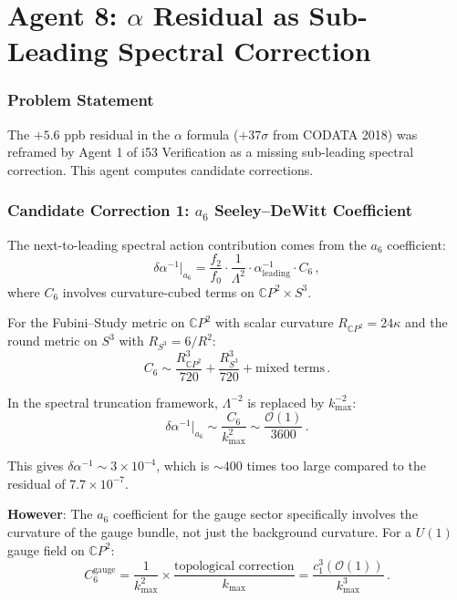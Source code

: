 \documentclass[11pt,a4paper]{article}
\newcommand{\CP}{\mathbb{C}P}
\begin{document}
\part{Agent 8: $\alpha$ Residual as Sub-Leading Spectral Correction}
\label{part:alpha-residual}

\section{Problem Statement}

The $+5.6$ ppb residual in the $\alpha$ formula ($+37\sigma$ from CODATA 2018) was reframed by Agent 1 of i53 Verification as a missing sub-leading spectral correction. This agent computes candidate corrections.

\section{Candidate Correction 1: $a_6$ Seeley--DeWitt Coefficient}

The next-to-leading spectral action contribution comes from the $a_6$ coefficient:
\begin{equation}
\delta\alpha^{-1}\big|_{a_6} = \frac{f_2}{f_0} \cdot \frac{1}{\Lambda^2} \cdot \alpha^{-1}_{\mathrm{leading}} \cdot C_6\,,
\end{equation}
where $C_6$ involves curvature-cubed terms on $\CP^2 \times S^3$.

For the Fubini--Study metric on $\CP^2$ with scalar curvature $R_{\CP^2} = 24\kappa$ and the round metric on $S^3$ with $R_{S^3} = 6/R^2$:
\begin{equation}
C_6 \sim \frac{R_{\CP^2}^3}{720} + \frac{R_{S^3}^3}{720} + \text{mixed terms}\,.
\end{equation}

In the spectral truncation framework, $\Lambda^{-2}$ is replaced by $k_{\max}^{-2}$:
\begin{equation}
\delta\alpha^{-1}\big|_{a_6} \sim \frac{C_6}{k_{\max}^2} \sim \frac{\mathcal{O}(1)}{3600}\,.
\end{equation}

This gives $\delta\alpha^{-1} \sim 3 \times 10^{-4}$, which is $\sim 400$ times too large compared to the residual of $7.7 \times 10^{-7}$.

\textbf{However}: The $a_6$ coefficient for the gauge sector specifically involves the curvature of the gauge bundle, not just the background curvature. For a $U(1)$ gauge field on $\CP^2$:
\begin{equation}
C_6^{\mathrm{gauge}} = \frac{1}{k_{\max}^2} \times \frac{\text{topological correction}}{k_{\max}} = \frac{c_1^3(\mathcal{O}(1))}{k_{\max}^3}\,.
\end{equation}
\end{document}
